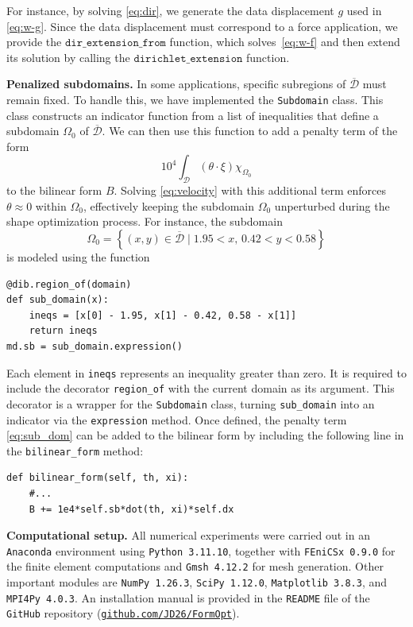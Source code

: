 \documentclass[iicol,pdflatex,sn-mathphys-ay]{sn-jnl}%
\theoremstyle{thmstyleone}%
\theoremstyle{thmstyletwo}%
\theoremstyle{thmstylethree}%
\begin{document}
For instance, by solving \eqref{eq:dir},
we generate the data displacement $g$ used in \eqref{eq:w-g}.
Since the data displacement must correspond to a force application,
we provide the $\texttt{dir\_extension\_from}$ function, which
solves~\eqref{eq:w-f} and then extend its solution by calling
the $\texttt{dirichlet\_extension}$ function.

\vspace{0.5cm}
\noindent \textbf{Penalized subdomains.}
In some applications, specific subregions of $\overline{\mathcal{D}}$
must remain fixed. 
To handle this, we have implemented the \texttt{Subdomain} class.
This class constructs an indicator function from a list of inequalities that
define a subdomain $\Omega_0$ of $\overline{\mathcal{D}}$.
We can then use this function to add a penalty term of the form
\begin{equation}\label{eq:sub_dom}
	{10}^4 \int_{\mathcal{D}} (\theta \cdot \xi) \chi_{\Omega_0}
\end{equation}
to the bilinear form $B$.
Solving \eqref{eq:velocity} with this additional term enforces
$\theta \approx 0$ within $\Omega_0$, effectively keeping
the subdomain $\Omega_0$ unperturbed during the shape optimization process.
For instance, the subdomain
\[
	\Omega_0=\left\{
		(x,y)\in \overline{\mathcal{D}} \mid 1.95<x,\, 0.42<y<0.58
	\right\}
\]
is modeled using the function
\begin{lstlisting}
@dib.region_of(domain)
def sub_domain(x):
    ineqs = [x[0] - 1.95, x[1] - 0.42, 0.58 - x[1]]
    return ineqs
md.sb = sub_domain.expression()
\end{lstlisting}
Each element in \texttt{ineqs} represents an inequality greater than zero.
It is required to include the decorator \texttt{region\_of} with the
current domain as its argument.
This decorator is a wrapper for the \texttt{Subdomain} class,
turning \texttt{sub\_domain} into an indicator via
the \texttt{expression} method.
Once defined, the penalty term \eqref{eq:sub_dom}
can be added to the bilinear form by including the
following line in the \texttt{bilinear\_form} method:
\begin{lstlisting}
def bilinear_form(self, th, xi):
	#...
	B += 1e4*self.sb*dot(th, xi)*self.dx
\end{lstlisting}

\vspace{0.5cm}
\noindent \textbf{Computational setup.}
All numerical experiments were carried out in an \texttt{Anaconda} environment
using \texttt{Python~3.11.10}, together with \texttt{FEniCSx~0.9.0} for
the finite element computations and \texttt{Gmsh~4.12.2} for mesh generation.
Other important modules are \texttt{NumPy~1.26.3}, \texttt{SciPy~1.12.0},
\texttt{Matplotlib~3.8.3}, and \texttt{MPI4Py~4.0.3}.
An installation manual is provided in the \texttt{README} file of
the \texttt{GitHub} repository
(\href{https://github.com/JD26/FormOpt}{\texttt{github.com/JD26/FormOpt}}).
\end{document}
